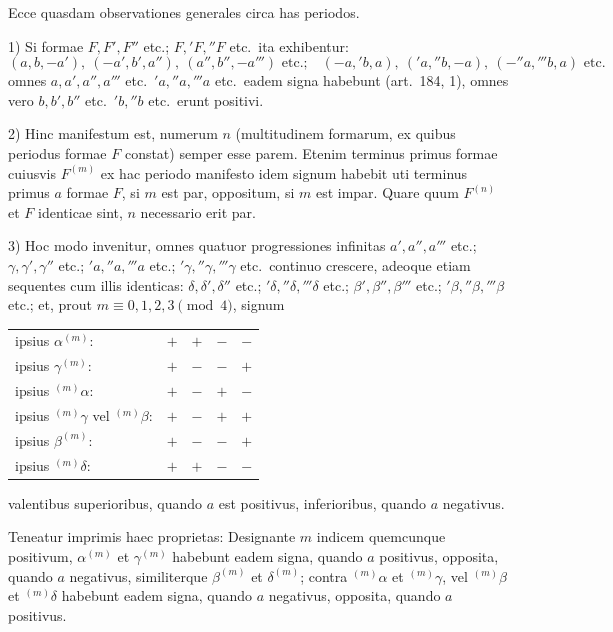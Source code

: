 \documentclass[12pt,a4paper]{article}
\theoremstyle{plain}
\theoremstyle{definition}
\theoremstyle{remark}
\begin{document}
Ecce quasdam observationes generales circa has periodos.

1) Si formae $F,F',F''$ etc.; $F,'F,''F$ etc.\ ita exhibentur:
\[(a,b,-a'),\ (-a',b',a''),\ (a'',b'',-a''')\text{ etc.;}\quad (-a,'b,a),\ ('a,''b,-a),\ (-''a,'''b,a)\text{ etc.}\]
omnes $a,a',a'',a'''$ etc.\ $'a,''a,'''a$ etc.\ eadem signa habebunt (art.\ 184, 1), omnes vero $b,b',b''$ etc.\ $'b,''b$ etc.\ erunt positivi.

2) Hinc manifestum est, numerum $n$ (multitudinem formarum, ex quibus periodus formae $F$ constat) semper esse parem. Etenim terminus primus formae cuiusvis $F^{(m)}$ ex hac periodo manifesto idem signum habebit uti terminus primus $a$ formae $F$, si $m$ est par, oppositum, si $m$ est impar. Quare quum $F^{(n)}$ et $F$ identicae sint, $n$ necessario erit par.

3) Hoc modo invenitur, omnes quatuor progressiones infinitas $a',a'',a'''$ etc.; $\gamma,\gamma',\gamma''$ etc.; $'a,''a,'''a$ etc.; $'\gamma,''\gamma,'''\gamma$ etc.\ continuo crescere, adeoque etiam sequentes cum illis identicas: $\delta,\delta',\delta''$ etc.; $'\delta,''\delta,'''\delta$ etc.; $\beta',\beta'',\beta'''$ etc.; $'\beta,''\beta,'''\beta$ etc.; et, prout $m\equiv 0,1,2,3\pmod{4}$, signum
\begin{center}
\begin{tabular}{lcccc}
ipsius $\alpha^{(m)}$: & $+$ & $+$ & $-$ & $-$ \\
ipsius $\gamma^{(m)}$: & $+$ & $-$ & $-$ & $+$ \\
ipsius $^{(m)}\alpha$: & $+$ & $-$ & $+$ & $-$ \\
ipsius $^{(m)}\gamma$ vel $^{(m)}\beta$: & $+$ & $-$ & $+$ & $+$ \\
ipsius $\beta^{(m)}$: & $+$ & $-$ & $-$ & $+$ \\
ipsius $^{(m)}\delta$: & $+$ & $+$ & $-$ & $-$ \\
\end{tabular}
\end{center}
valentibus superioribus, quando $a$ est positivus, inferioribus, quando $a$ negativus.

Teneatur imprimis haec proprietas: Designante $m$ indicem quemcunque positivum, $\alpha^{(m)}$ et $\gamma^{(m)}$ habebunt eadem signa, quando $a$ positivus, opposita, quando $a$ negativus, similiterque $\beta^{(m)}$ et $\delta^{(m)}$; contra $^{(m)}\alpha$ et $^{(m)}\gamma$, vel $^{(m)}\beta$ et $^{(m)}\delta$ habebunt eadem signa, quando $a$ negativus, opposita, quando $a$ positivus.
\end{document}
